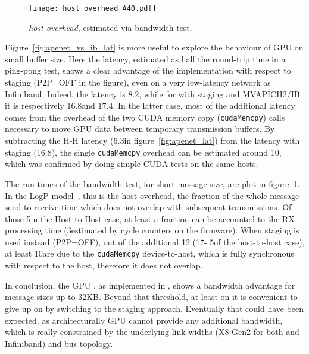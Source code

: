 \begin{figure}[!hbt]
  \centering \texttt{[image: host\_overhead\_A40.pdf]}
\caption{\apenetp \textit{host overhead}, estimated via bandwidth
test.}
\label{fig:host_overhead}
\end{figure}


Figure~\ref{fig:apenet_vs_ib_lat} is more useful to explore the
behaviour of GPU \PtoP on small buffer size.
Here the latency, estimated as half the round-trip time in a ping-pong
test, shows a clear advantage of the \PtoP implementation with respect
to staging (P2P=OFF in the figure), even on a very low-latency network
as Infiniband.
Indeed, the \apenetp \PtoP latency is 8.2\us, while for \apenetp with
staging and MVAPICH2/IB it is respectively 16.8\us and 17.4\us.
In the latter case, most of the additional latency comes from the
overhead of the two CUDA memory copy (\texttt{cudaMemcpy}) calls
necessary to move GPU data between temporary transmission buffers.
By subtracting the \apenetp H-H latency (6.3\us in
figure~\ref{fig:apenet_lat}) from the \apenetp latency with staging
(16.8\us), the single \texttt{cudaMemcpy} overhead can be estimated
around 10\us, which was confirmed by doing simple CUDA tests on the
same hosts.

The run times of the bandwidth test, for short message size, are plot
in figure~\ref{fig:host_overhead}.
In the LogP model~\cite{Culler:1993:LogP}, this is the host overhead,
\ie the fraction of the whole message send-to-receive time which does
not overlap with subsequent transmissions.
Of those 5\us in the Host-to-Host case, at least a fraction can be
accounted to the RX processing time (3\us estimated by cycle counters
on the \nios firmware).
When staging is used instead (P2P=OFF), out of the additional 12\us
(17\us - 5\us of the host-to-host case), at least 10\us are due to the
\texttt{cudaMemcpy} device-to-host, which is fully synchronous with
respect to the host, therefore it does not overlap.

In conclusion, the GPU \PtoP, as implemented in \apenetp, shows a
bandwidth advantage for message sizes up to 32KB.
Beyond that threshold, at least on \apenetp it is convenient to give
up on \PtoP by switching to the staging approach.
Eventually that could have been expected, as architecturally GPU \PtoP
cannot provide any additional bandwidth, which is really constrained
by the underlying \PCIe link widths (X8 Gen2 for both \apenetp and
Infiniband) and bus topology.

